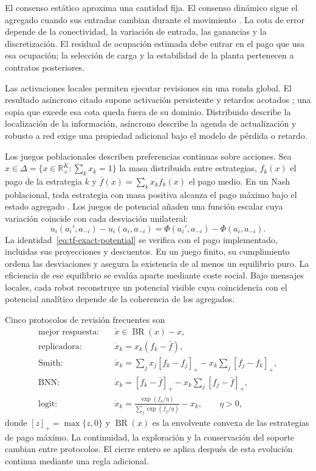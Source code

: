 El consenso estático aproxima una cantidad fija. El consenso dinámico sigue el agregado cuando sus entradas cambian durante el movimiento \parencite{kia2019dynamicConsensus}. La cota de error depende de la conectividad, la variación de entrada, las ganancias y la discretización. El residual de ocupación estimada debe entrar en el pago que usa esa ocupación; la selección de carga y la estabilidad de la planta pertenecen a contratos posteriores.

Las activaciones locales permiten ejecutar revisiones sin una ronda global. El resultado asíncrono citado supone activación persistente y retardos acotados \parencite{tsitsiklis1986asynchronousOptimization}; una copia que excede esa cota queda fuera de su dominio. Distribuido describe la localización de la información, asíncrono describe la agenda de actualización y robusto a red exige una propiedad adicional bajo el modelo de pérdida o retardo.

Los juegos poblacionales describen preferencias continuas sobre acciones. Sea $x\in\Delta=\{x\in\mathbb R_+^K:\sum_kx_k=1\}$ la masa distribuida entre estrategias, $f_k(x)$ el pago de la estrategia $k$ y $\bar f(x)=\sum_kx_kf_k(x)$ el pago medio. En un Nash poblacional, toda estrategia con masa positiva alcanza el pago máximo bajo el estado agregado \parencite{sandholm2010population}. Los juegos de potencial añaden una función escalar cuya variación coincide con cada desviación unilateral:
\begin{equation}
  u_i(a_i',a_{-i})-u_i(a_i,a_{-i})
  =\Phi(a_i',a_{-i})-\Phi(a_i,a_{-i}).
  \label{eq:tf-exact-potential}
\end{equation}
La identidad~\eqref{eq:tf-exact-potential} se verifica con el pago implementado, incluidas sus proyecciones y descuentos. En un juego finito, su cumplimiento ordena las desviaciones y asegura la existencia de al menos un equilibrio puro. La eficiencia de ese equilibrio se evalúa aparte mediante coste social. Bajo mensajes locales, cada robot reconstruye un potencial visible cuya coincidencia con el potencial analítico depende de la coherencia de los agregados.

Cinco protocolos de revisión frecuentes son
\begin{equation}
\begin{aligned}
 \text{mejor respuesta:}\quad &\dot x\in\operatorname{BR}(x)-x,\\
 \text{replicadora:}\quad &\dot x_k=x_k(f_k-\bar f),\\
 \text{Smith:}\quad &\dot x_k=\sum_jx_j[f_k-f_j]_+-x_k\sum_j[f_j-f_k]_+,\\
 \text{BNN:}\quad &\dot x_k=[f_k-\bar f]_+-x_k\sum_j[f_j-\bar f]_+,\\
 \text{logit:}\quad &\dot x_k=\frac{\exp(f_k/\eta)}{\sum_j\exp(f_j/\eta)}-x_k,\qquad \eta>0,
\end{aligned}
\label{eq:tf-population-dynamics}
\end{equation}
donde $[z]_+=\max\{z,0\}$ y $\operatorname{BR}(x)$ es la envolvente convexa de las estrategias de pago máximo. La continuidad, la exploración y la conservación del soporte cambian entre protocolos. El cierre entero se aplica después de esta evolución continua mediante una regla adicional.

